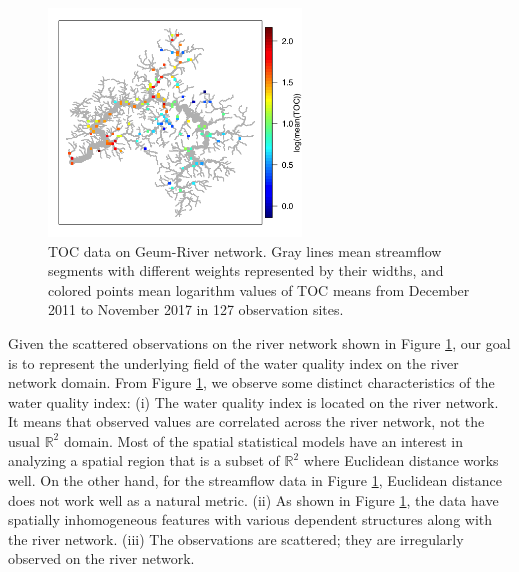\documentclass[11pt,titlepage]{article}
\begin{document}
\begin{figure}
		\centering
		\includegraphics[width=0.6\textwidth]{Stream_result/Figure01.png}
		\vspace{-4mm}
		\caption{TOC data on Geum-River network. Gray lines mean streamflow segments with different weights represented by their widths, and colored points mean logarithm values of TOC means from December 2011 to November 2017 in 127 observation sites.}
		\label{fig:fig1}
\end{figure}

Given the scattered observations on the river network shown in Figure \ref{fig:fig1}, our goal is to represent the underlying field of the water quality index on the river network domain. From Figure \ref{fig:fig1}, we observe some distinct characteristics of the water quality index: (i) The water quality index is located on the river network. It means that observed values are correlated across the river network, not the usual $\mathbb{R}^2$ domain. Most of the spatial statistical models have an interest in analyzing a spatial region that is a subset of $\mathbb{R}^2$ where Euclidean distance works well. On the other hand, for the streamflow data in Figure \ref{fig:fig1}, Euclidean distance does not work well as a natural metric. (ii) As shown in Figure \ref{fig:fig1}, the data have spatially inhomogeneous features with various dependent structures along with the river network. (iii) The observations are scattered; they are irregularly observed on the river network.  
\end{document}
